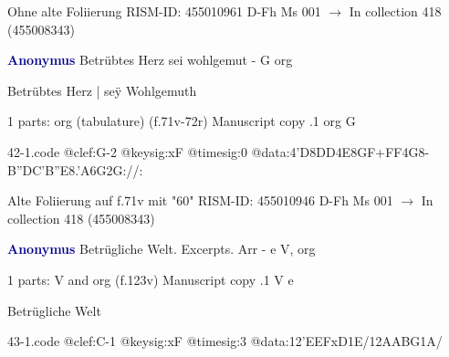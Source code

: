 \documentclass[twocolumn]{book}
\begin{document}
\newline Ohne alte Foliierung
\newline RISM-ID: 455010961
\newline D-Fh  Ms 001
\newline $\rightarrow$ In collection 418 (455008343)
      
\newline \par \vspace{7pt} \textcolor{darkblue}{\textbf{Anonymus  }}
\newline Betrübtes Herz sei wohlgemut - G
\newline org
\newline \begin{itshape}[f.71v, at left:] Betrübtes Herz | seÿ Wohlgemuth\end{itshape} 
\newline \textcolor{darkblue}{}  1 parts: org (tabulature)  (f.71v-72r)
\newline Manuscript copy
.1  org  G  
\begin{filecontents*}{42-1.code}
@clef:G-2
@keysig:xF
@timesig:0
@data:4'D{8DD}4E{8GF+}{FF}4G8-{B''DC}{'B''E8.'A6G}2G://:
\end{filecontents*}
\newline
%

\newline Alte Foliierung auf f.71v mit "60"
\newline RISM-ID: 455010946
\newline D-Fh  Ms 001
\newline $\rightarrow$ In collection 418 (455008343)
      
\newline \par \vspace{7pt} \textcolor{darkblue}{\textbf{Anonymus  }}
\newline Betrügliche Welt. Excerpts. Arr - e
\newline V, org
\newline \begin{itshape}\end{itshape} 
\newline \textcolor{darkblue}{}  1 parts: V and org  (f.123v)
\newline Manuscript copy
.1  V  e
\newline \begin{footnotesize} Betrügliche Welt \end{footnotesize}  
\begin{filecontents*}{43-1.code}
@clef:C-1
@keysig:xF
@timesig:3
@data:12'EEFxD1E/12AABG1A/
\end{filecontents*}
\newline
%
\end{document}
